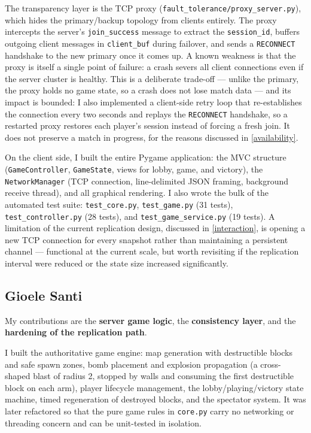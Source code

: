 \documentclass{scrartcl}
\begin{document}
The transparency layer is the TCP proxy (\texttt{fault\_tolerance/proxy\_server.py}), which hides the primary/backup topology from clients entirely.
The proxy intercepts the server's \texttt{join\_success} message to extract the \texttt{session\_id}, buffers outgoing client messages in \texttt{client\_buf} during failover, and sends a \texttt{RECONNECT} handshake to the new primary once it comes up.
A known weakness is that the proxy is itself a single point of failure: a crash severs all client connections even if the server cluster is healthy.
This is a deliberate trade-off --- unlike the primary, the proxy holds no game state, so a crash does not lose match data --- and its impact is bounded: I also implemented a client-side retry loop that re-establishes the connection every two seconds and replays the \texttt{RECONNECT} handshake, so a restarted proxy restores each player's session instead of forcing a fresh join.
It does not preserve a match in progress, for the reasons discussed in \cref{availability}.

On the client side, I built the entire Pygame application: the MVC structure (\texttt{GameController}, \texttt{GameState}, views for lobby, game, and victory), the \texttt{NetworkManager} (TCP connection, line-delimited JSON framing, background receive thread), and all graphical rendering.
I also wrote the bulk of the automated test suite: \texttt{test\_core.py},
\texttt{test\_game.py} (31 tests), \texttt{test\_controller.py} (28 tests), and
\texttt{test\_game\_service.py} (19 tests).
A limitation of the current replication design, discussed in \cref{interaction}, is opening a new TCP connection for every snapshot rather than maintaining a persistent channel --- functional at the current scale, but worth revisiting if the replication interval were reduced or the state size increased significantly.

\subsection{Gioele Santi}

My contributions are the \textbf{server game logic}, the \textbf{consistency
layer}, and the \textbf{hardening of the replication path}.

I built the authoritative game engine: map generation with destructible blocks
and safe spawn zones, bomb placement and explosion propagation (a cross-shaped
blast of radius 2, stopped by walls and consuming the first destructible block on
each arm), player lifecycle management, the lobby/playing/victory state machine,
timed regeneration of destroyed blocks, and the spectator system. It was later
refactored so that the pure game rules in \texttt{core.py} carry no networking or
threading concern and can be unit-tested in isolation.
\end{document}
